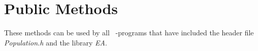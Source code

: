 \section{Public Methods}

These methods can be used by all \cpp\ -programs that have included
the header file {\em Population.h} and the library {\em EA}.

\vspace*{4ex}


\clearpage


\vspace*{4ex}


\vspace*{4ex}


\vspace*{4ex}


\clearpage


\vspace*{4ex}


\vspace*{4ex}


\clearpage


\vspace*{4ex}





